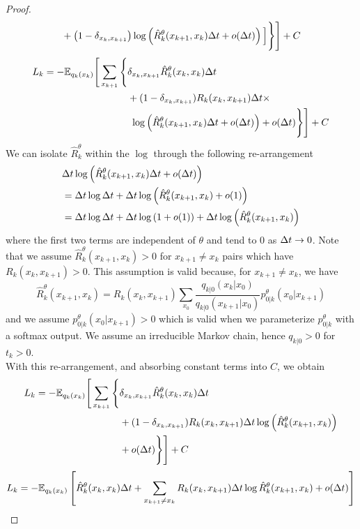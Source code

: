 \documentclass{article}
\begin{document}
\begin{proof}
\begin{align}
    & \quad + \left( 1 - \delta_{x_k, x_{k+1}} \right) \log \left( \hat{R}_k^\theta(x_{k+1}, x_k) \Delta t + o(\Delta t) \right) \Big] \Bigg\} \Bigg] + C
\end{align}
\begin{align}
    L_k = - \mathbb{E}_{q_k(x_k)} \Bigg[ \sum_{x_{k+1}} \Bigg\{& \delta_{x_k, x_{k+1}} \hat{R}_k^\theta(x_k, x_k) \Delta t\\
    &+ ( 1 - \delta_{x_k, x_{k+1}}) R_k(x_k, x_{k+1}) \Delta t \times \\
    & \,\, \log \Big( \hat{R}_k^\theta(x_{k+1}, x_k) \Delta t + o(\Delta t) \Big) + o(\Delta t) \Bigg\} \Bigg] + C
\end{align}
We can isolate $\hat{R}_k^\theta$ within the $\log$ through the following re-arrangement
\begin{align}
   &\Delta t \log \left( \hat{R}_k^\theta(x_{k+1}, x_k) \Delta t + o(\Delta t) \right)\\
   &= \Delta t \log \Delta t + \Delta t \log \left( \hat{R}_k^\theta(x_{k+1}, x_k) + o(1) \right)\\
   &= \Delta t \log \Delta t  + \Delta t \log \left(1 + o(1) \right)+ \Delta t \log \left( \hat{R}_k^\theta(x_{k+1}, x_k) \right)
\end{align}
where the first two terms are independent of $\theta$ and tend to $0$ as $\Delta t \rightarrow 0$. Note that we assume $\hat{R}_k^\theta(x_{k+1}, x_k) > 0$ for $x_{k+1} \neq x_k$ pairs which have $R_k(x_k, x_{k+1}) > 0$. This assumption is valid because, for $x_{k+1} \neq x_k$, we have
\begin{equation}
    \hat{R}_k^\theta(x_{k+1}, x_k) = R_k(x_k ,x_{k+1}) \sum_{x_0} \frac{q_{k|0}(x_k | x_0)}{q_{k|0}(x_{k+1} | x_0)} p^\theta_{0|k}(x_0 | x_{k+1})
\end{equation}
and we assume $p_{0|k}^\theta(x_0 | x_{k+1}) > 0$ which is valid when we parameterize $p_{0|k}^\theta$ with a softmax output. We assume an irreducible Markov chain, hence $q_{k|0} > 0$ for $t_k > 0$.\\

With this re-arrangement, and absorbing constant terms into $C$, we obtain
\begin{align}
    L_k = - \mathbb{E}_{q_k(x_k)} \Bigg[ \sum_{x_{k+1}} \Bigg\{& \delta_{x_k, x_{k+1}} \hat{R}_k^\theta(x_k, x_k) \Delta t \\
    &  +(1 - \delta_{x_k, x_{k+1}}) R_k(x_k, x_{k+1}) \Delta t \log \Big( \hat{R}_k^\theta(x_{k+1}, x_k) \Big) \\
    &+ o(\Delta t) \Bigg\} \Bigg] + C
\end{align}
\begin{equation}
    L_k = - \mathbb{E}_{q_k(x_k)} \left[ \hat{R}_k^\theta(x_k, x_k)\Delta t + \sum_{x_{k+1} \neq x_k} R_k(x_k, x_{k+1}) \Delta t \log \hat{R}_k^\theta(x_{k+1}, x_k) + o(\Delta t)\right]
\end{equation}


\end{proof}
\end{document}
